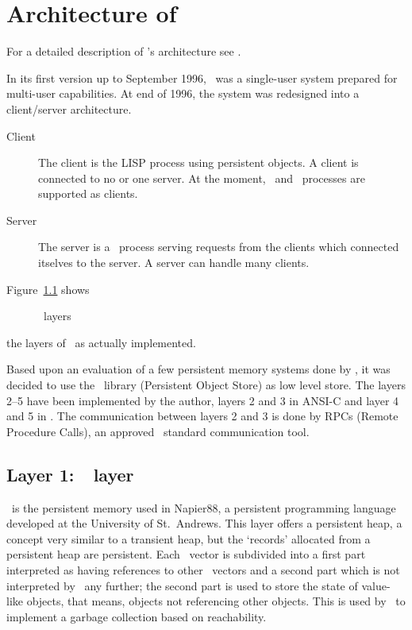%

\chapter[Architecture]%
{Architecture of \protect\plob}

For a detailed description of \protect\plob's architecture see
\cite{bib:Kirschke-99}.

In its first version up to September 1996, \plob\ was a single-user
system prepared for multi-user capabilities. At end of 1996, the
system was redesigned into a client/server architecture.
\begin{description}

\item[Client] The client is the LISP process using persistent
  objects. A client is connected to no or one server. At the moment,
  \lwcl\ and \allegrocl\ processes are supported as clients.

\item[Server] The server is a \unix\ process serving requests from the
  clients which connected itselves to the server. A server can handle
  many clients.

\end{description}

Figure~\ref{sec:PLOBwRPCs} shows 
\begin{figure}[htbp]
\centerline{}
\caption{\protect\plob\ layers}%
\label{sec:PLOBwRPCs}
\end{figure}%
the layers of \plob\ as actually implemented.

Based upon an evaluation of a few persistent memory systems done by
\cite{bib:Mueller-91}, it was decided to use the \postore\ library
(Persistent Object Store) as low level store.  The layers 2--5 have
been implemented by the author, layers 2 and 3 in ANSI-C and layer 4
and 5 in \cl. The communication between layers 2 and 3 is done by RPCs
(Remote Procedure Calls), an approved \unix\ standard communication
tool.

\section[POSTORE layer]%
{Layer 1:\ \protect\postore\ layer}

\postore\ is the persistent memory used in Napier88, a persistent
programming language developed at the University of St.\ Andrews.
This layer offers a persistent heap, a concept very similar to a
transient heap, but the `records' allocated from a persistent heap are
persistent. Each \postore\ vector is subdivided into a first part
interpreted as having references to other \postore\ vectors and a
second part which is not interpreted by \postore\ any further; the
second part is used to store the state of value-like objects, that
means, objects not referencing other objects. This is used by
\postore\ to implement a garbage collection based on reachability.

